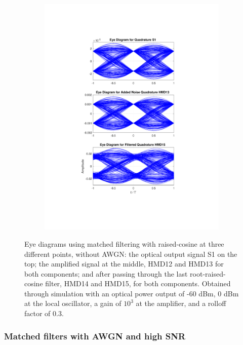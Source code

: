 \begin{figure}[H]
\begin{subfigure}{.45\textwidth}
		\includegraphics[clip, trim=5cm 4cm 5cm 4cm, width=\textwidth]{./sdf/m_qam_system/figures/eyes/q_nn_p_60_03_rc.pdf}
	\end{subfigure}
	
	\caption{Eye diagrams using matched filtering with raised-cosine at three different points, without AWGN: the optical output signal S1 on the top; the amplified signal at the middle, HMD12 and HMD13 for both components; and after passing through the last root-raised-cosine filter, HMD14 and HMD15, for both components. Obtained through simulation with an optical power output of -60 dBm, 0 dBm at the local oscillator, a gain of $10^3$ at the amplifier, and a rolloff factor of 0.3.\label{fig:eyes_nn_rc_03}}
	
\end{figure}
\subsubsection*{Matched filters with AWGN and high SNR}

